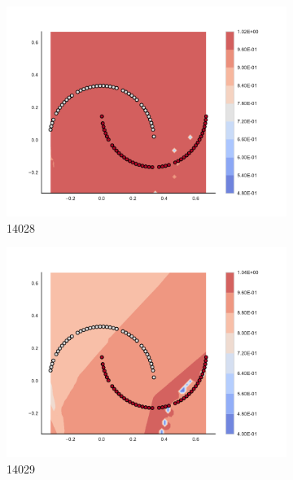 \begin{figure}[h]
\begin{subfigure}[b]{0.09\textwidth}
    \includegraphics[clip, trim=2.35cm 1.75cm 4.5cm 0cm,width=\textwidth]{img/convergence/14028.pdf}
    \caption{14028}
    \label{fig:convergence_14028}
\end{subfigure}
%
\begin{subfigure}[b]{0.09\textwidth}
    \includegraphics[clip, trim=2.35cm 1.75cm 4.5cm 0cm,width=\textwidth]{img/convergence/14029.pdf}
    \caption{14029}
    \label{fig:convergence_14029}
\end{subfigure}
%
\begin{subfigure}[b]{0.09\textwidth}

\end{subfigure}
\end{figure}
